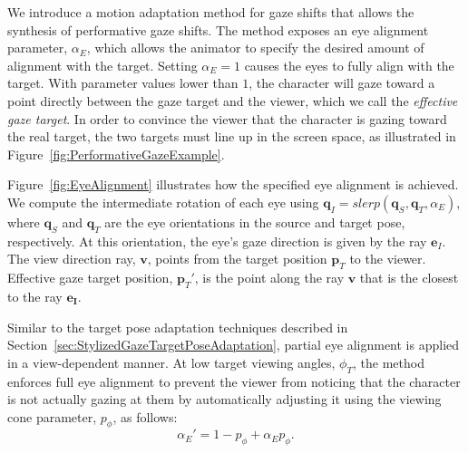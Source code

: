We introduce a motion adaptation method for gaze shifts that allows the synthesis of performative gaze shifts. The method exposes an eye alignment parameter, $\alpha_E$, which allows the animator to specify the desired amount of alignment with the target. Setting $\alpha_E = 1$ causes the eyes to fully align with the target.
With parameter values lower than $1$, the character will gaze toward a point directly between the gaze target and the viewer, which we call the \textit{effective gaze target}. In order to convince the viewer that the character is gazing toward the real target, the two targets must line up in the screen space, as illustrated in Figure~\ref{fig:PerformativeGazeExample}.

Figure~\ref{fig:EyeAlignment} illustrates how the specified eye alignment is achieved. We compute the intermediate rotation of each eye using $\mathbf{q}_I = slerp (\mathbf{q}_S, \mathbf{q}_T, \alpha_E )$, where $\mathbf{q}_S$ and $\mathbf{q}_T$ are the eye orientations in the source and target pose, respectively. At this orientation, the eye's gaze direction is given by the ray $\mathbf{e}_I$. The view direction ray, $\mathbf{v}$, points from the target position $\mathbf{p}_T$ to the viewer. Effective gaze target position, $\mathbf{p}_T'$, is the point along the ray $\mathbf{v}$ that is the closest to the ray $\mathbf{e_I}$.

Similar to the target pose adaptation techniques described in Section~\ref{sec:StylizedGazeTargetPoseAdaptation}, partial eye alignment is applied in a view-dependent manner. At low target viewing angles, $\phi_T$, the method enforces full eye alignment to prevent the viewer from noticing that the character is not actually gazing at them by automatically adjusting it using the viewing cone parameter, $p_{\phi}$, as follows:
%
\begin{equation}
\alpha_E' = 1 - p_{\phi} + \alpha_E p_{\phi}.
\end{equation} 